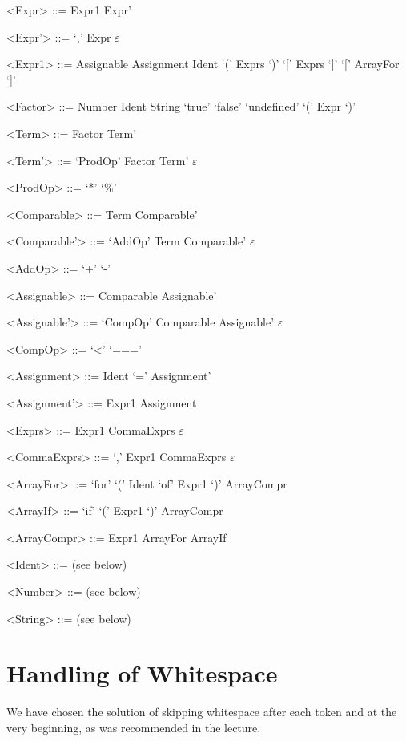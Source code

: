 \documentclass{article}
\begin{document}
\begin{grammar}
	\let\syntleft\relax
	\let\syntright\relax
	
	<Expr> ::= Expr1 Expr'
	
	<Expr'> ::= `,' Expr
	\alt $\varepsilon$

	<Expr1> ::= Assignable
	\alt Assignment
	\alt Ident `(' Exprs `)'
	\alt `[' Exprs `]'
	\alt `[' ArrayFor `]'
		
	<Factor> ::= Number
	\alt Ident
	\alt String
	\alt `true'
	\alt `false'
	\alt `undefined'
	\alt `(' Expr `)'
	
	<Term> ::= Factor Term'
	
	<Term'> ::= `ProdOp' Factor Term'
	\alt $\varepsilon$
	
	<ProdOp> ::= `*'
	\alt `\%'
	
	<Comparable> ::= Term Comparable'
	
	<Comparable'> ::= `AddOp' Term Comparable'
	\alt $\varepsilon$
	
	<AddOp> ::= `+'
	\alt `-'
	
	<Assignable> ::= Comparable Assignable'
	
	<Assignable'> ::= `CompOp' Comparable Assignable'
	\alt $\varepsilon$
	
	
	<CompOp> ::= `<'
	\alt `==='
	
	<Assignment> ::= Ident `=' Assignment'
	
	<Assignment'> ::= Expr1
	\alt Assignment
	
	<Exprs> ::= Expr1 CommaExprs
	\alt $\varepsilon$	
	
	<CommaExprs> ::= `,' Expr1 CommaExprs
	\alt $\varepsilon$
	
	<ArrayFor> ::= `for' `(' Ident `of' Expr1 `)' ArrayCompr
	
	<ArrayIf> ::= `if' `(' Expr1 `)' ArrayCompr
	
	<ArrayCompr> ::= Expr1
	\alt ArrayFor
	\alt ArrayIf
	
	<Ident> ::= (see below)
	
	<Number> ::= (see below)
	
	<String> ::= (see below)
\end{grammar}


\section{Handling of Whitespace}
We have chosen the solution of skipping whitespace after each token and at the very beginning, as was recommended in the lecture.
\end{document}
